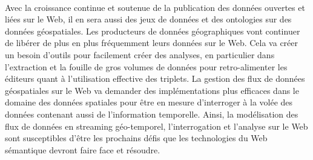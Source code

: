 \documentclass[a4paper,11pt,twoside]{report}
\begin{document}
 
 



\paragraph{}
 
Avec la croissance continue et soutenue de la publication des données ouvertes et liées sur le Web, il en sera aussi des jeux de données et des ontologies sur des données géospatiales. Les producteurs de données  géographiques vont continuer de libérer de plus en plus fréquemment leurs données sur le Web. Cela va créer un besoin d'outils pour facilement créer des analyses, en particulier dans l'extraction et la fouille de gros volumes de données pour retro-alimenter les éditeurs quant à l'utilisation effective des triplets. La gestion des flux de données géospatiales sur le Web va demander des implémentations plus efficaces dans le domaine des données spatiales pour être en mesure d'interroger à la volée des données contenant aussi de l'information temporelle. Ainsi, la modélisation des flux de données en streaming géo-temporel, l'interrogation et l'analyse sur le Web sont susceptibles d'être les prochains défis que les technologies du Web sémantique devront faire face et résoudre.
\end{document}
